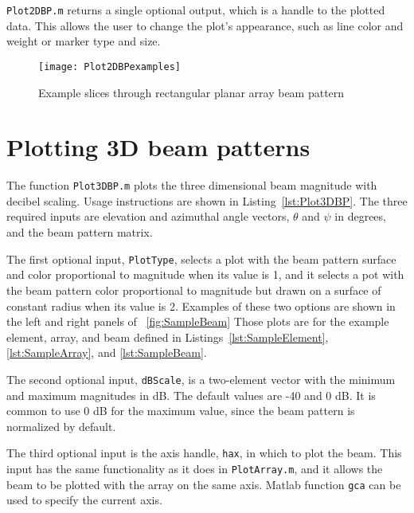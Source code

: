 \texttt{Plot2DBP.m} returns a single optional output, which is a handle to the plotted data. This allows the user to change the plot's appearance, such as line color and weight or marker type and size.



\clearpage
\begin{sidewaysfigure}[!ht]
\begin{center}
\texttt{[image: Plot2DBPexamples]}
\caption{\label{fig:Plot2DBPexamples}Example slices through rectangular planar array beam pattern}
\end{center}
\end{sidewaysfigure}

\clearpage
\section{Plotting 3D beam patterns}

The function \texttt{Plot3DBP.m} plots the three dimensional beam magnitude with decibel scaling. Usage instructions are shown in Listing~\ref{lst:Plot3DBP}. The three required inputs are elevation and azimuthal angle vectors, $\theta$ and $\psi$ in degrees, and the beam pattern matrix. 

The first optional input, \texttt{PlotType}, selects a plot with the beam pattern surface and color proportional to magnitude when its value is 1, and it selects a pot with the beam pattern color proportional to magnitude but drawn on a surface of constant radius when its value is 2. Examples of these two options are shown in the left and right panels of \figname~\ref{fig:SampleBeam} Those plots are for the example element, array, and beam defined in Listings~\ref{lst:SampleElement}, \ref{lst:SampleArray}, and \ref{lst:SampleBeam}.

The second optional input, \texttt{dBScale}, is a two-element vector with the minimum and maximum magnitudes in dB. The default values are -40 and 0 dB. It is common to use 0 dB for the maximum value, since the beam pattern is normalized by default.

The third optional input is the axis handle, \texttt{hax}, in which to plot the beam. This input has the same functionality as it does in \texttt{PlotArray.m}, and it allows the beam to be plotted with the array on the same axis. Matlab function \texttt{gca} can be used to specify the current axis.


